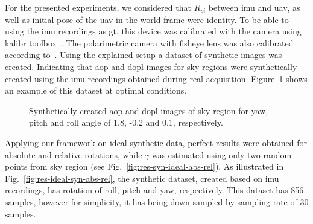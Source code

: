 For the presented experiments, we considered that $R_{vi}$ between \gls{imu} and
\gls{uav}, as well as initial pose of the \gls{uav} in the world frame were
identity.  To be able to using the \gls{imu} recordings as \gls{gt}, this device was
calibrated with the camera using kalibr toolbox~\cite{furgale2013unified,
  furgale2012continuous}. The polarimetric camera with fisheye lens was also
calibrated according to~\cite{kannala2006generic}.
Using the explained setup a dataset of synthetic images was
created.
Indicating that \gls{aop} and \gls{dopl} images for sky regions were
synthetically created using the \gls{imu} recordings obtained during real
acquisition. Figure~\ref{fig:aop-dop-syn} shows an example of this dataset at
optimal conditions.
\begin{figure}
    \centering
    \hfill
    \label{fig:aop-syn}
    \label{fig:dop-syn}
    \hspace*{\fill}
    \caption{Synthetically created \gls{aop} and \gls{dopl} images of sky
      region for yaw, pitch and roll angle of 1.8, -0.2 and 0.1, respectively.}
    \label{fig:aop-dop-syn}
\end{figure}

Applying our framework on ideal synthetic data, perfect results were obtained
for absolute and relative rotations, while $\gamma$ was estimated using only
two random points from sky region (see Fig.~\ref{fig:res-syn-ideal-abs-rel}).
As illustrated in Fig.~\ref{fig:res-ideal-syn-abs-rel}, the synthetic dataset,
created based on \gls{imu} recordings, has rotation of roll, pitch and yaw,
respectively. This dataset has 856 samples, however for simplicity, it has
being down sampled by sampling rate of 30 samples.

